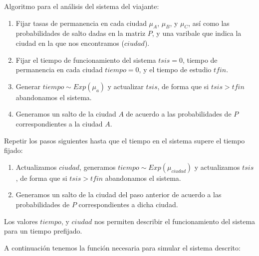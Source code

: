 \documentclass[
]{book}
\providecommand{\tightlist}{%
  \setlength{\itemsep}{0pt}\setlength{\parskip}{0pt}}
\newenvironment{silverbox}{
  \definecolor{shadecolor}{rgb}{192, 192, 192}  
  \color{black}
  \begin{shaded}}
 {\end{shaded}}
\theoremstyle{definition}
\theoremstyle{definition}
\theoremstyle{definition}
\theoremstyle{definition}
\theoremstyle{remark}
\begin{document}
\begin{silverbox}
Algoritmo para el análisis del sistema del viajante:

\begin{enumerate}
\def\labelenumi{\arabic{enumi}.}
\tightlist
\item
  Fijar tasas de permanencia en cada ciudad \(\mu_A\), \(\mu_B\), y \(\mu_C\), así como las probabilidades de salto dadas en la matriz \(P\), y una varibale que indica la ciudad en la que nos encontramos (\(ciudad\)).
\item
  Fijar el tiempo de funcionamiento del sistema \(tsis = 0\), tiempo de permanencia en cada ciudad \(tiempo = 0\), y el tiempo de estudio \(tfin\).
\item
  Generar \(tiempo \sim Exp(\mu_a)\) y actualizar \(tsis\), de forma que si \(tsis > tfin\) abandonamos el sistema.
\item
  Generamos un salto de la ciudad \(A\) de acuerdo a las probabilidades de \(P\) correspondientes a la ciudad \(A\).
\end{enumerate}

Repetir los pasos siguientes hasta que el tiempo en el sistema supere el tiempo fijado:

\begin{enumerate}
\def\labelenumi{\arabic{enumi}.}
\setcounter{enumi}{4}
\tightlist
\item
  Actualizamos \(ciudad\), generamos \(tiempo \sim Exp(\mu_{ciudad})\) y actualizamos \(tsis\), de forma que si \(tsis > tfin\) abandonamos el sistema.
\item
  Generamos un salto de la ciudad del paso anterior de acuerdo a las probabilidades de \(P\) correspondientes a dicha ciudad.
\end{enumerate}

Los valores \(tiempo\), y \(ciudad\) nos permiten describir el funcionamiento del sistema para un tiempo prefijado.

\end{silverbox}

A continuación tenemos la función necesaria para simular el sistema descrito:
\end{document}
